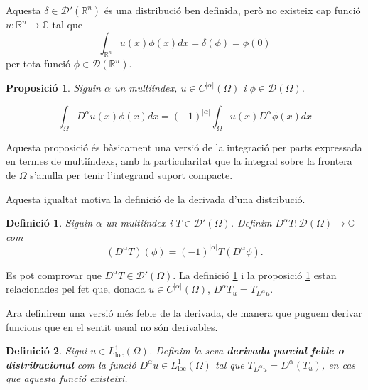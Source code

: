 \documentclass{article}
\numberwithin{equation}{section}
\newtheorem{definicio}{Definici\'{o}}[section]
\newtheorem{proposicio}{Proposici\'{o}}[section]
\begin{document}
Aquesta $\delta\in\mathcal{D}'(\mathbb{R}^n)$ \'{e}s una distribuci\'{o} ben definida, per\`{o} no existeix cap funci\'{o} $u:\mathbb{R}^n\rightarrow\mathbb{C}$ tal que
\[\int_{\mathbb{R}^n}u(x)\phi(x)dx=\delta(\phi)=\phi(0)\]
per tota funci\'{o} $\phi\in\mathcal{D}(\mathbb{R}^n)$.

\begin{proposicio}\label{Pro: integracio per parts multiindex}
Siguin $\alpha$ un multi\'{i}ndex, $u\in C^{|\alpha|}(\Omega)$ i $\phi\in\mathcal{D}(\Omega)$.

\[\int_{\Omega}D^{\alpha}u(x)\phi(x)dx=(-1)^{|\alpha|}\int_{\Omega}u(x)D^{\alpha}\phi(x)dx\]
\end{proposicio}

Aquesta proposici\'{o} \'{e}s b\`{a}sicament una versi\'{o} de la integraci\'{o} per parts expressada en termes de multi\'{i}ndexs, amb la particularitat que la integral sobre la frontera de $\Omega$ s'anul\textperiodcentered la per tenir l'integrand suport compacte.

Aquesta igualtat motiva la definici\'{o} de la derivada d'una distribuci\'{o}.

\begin{definicio}\label{Def: derivada distribucional}
Siguin $\alpha$ un multi\'{i}ndex i $T\in\mathcal{D}'(\Omega)$. Definim $D^{\alpha}T:\mathcal{D}(\Omega)\rightarrow\mathbb{C}$ com
\begin{equation}
(D^{\alpha}T)(\phi)=(-1)^{|\alpha|}T(D^{\alpha}\phi).
\end{equation}
\end{definicio}

Es pot comprovar que $D^{\alpha}T\in\mathcal{D}'(\Omega)$. La definici\'{o} \ref{Def: derivada distribucional} i la proposici\'{o} \ref{Pro: integracio per parts multiindex} estan relacionades pel fet que, donada $u\in C^{|\alpha|}(\Omega)$, $D^{\alpha}T_u=T_{D^{\alpha}u}$.

Ara definirem una versi\'{o} m\'{e}s feble de la derivada, de manera que puguem derivar funcions que en el sentit usual no s\'{o}n derivables.

\begin{definicio}\label{Def: derivada feble}
Sigui $u\in L_{\text{loc}}^1(\Omega)$. Definim la seva \textbf{derivada parcial feble o distribucional} com la funci\'{o} $D^{\alpha}u\in L_{\text{loc}}^1(\Omega)$ tal que $T_{D^{\alpha}u}=D^{\alpha}(T_u)$, en cas que aquesta funci\'{o} existeixi. 
\end{definicio}
\end{document}
